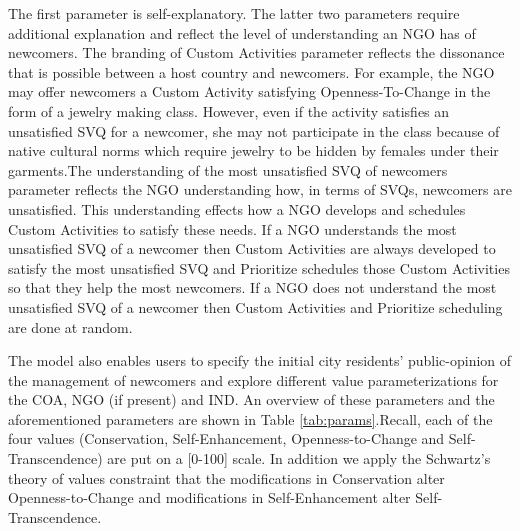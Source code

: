 \documentclass{scspaperproc}
\theoremstyle{scsthe}
\begin{document}
The first parameter is self-explanatory. The latter two parameters require additional explanation and reflect the level of understanding an NGO has of newcomers. The branding of Custom Activities parameter reflects the dissonance that is possible between a host country and newcomers. For example, the NGO may offer newcomers a Custom Activity satisfying Openness-To-Change in the form of a jewelry making class. However, even if the activity satisfies an unsatisfied SVQ for a newcomer, she may not participate in the class because of native cultural norms which require jewelry to be hidden by females under their garments.The understanding of the most unsatisfied SVQ of newcomers parameter reflects the NGO understanding how, in terms of SVQs, newcomers are unsatisfied. This understanding effects how a NGO develops and schedules Custom Activities to satisfy these needs. If a NGO understands the most unsatisfied SVQ of a newcomer then Custom Activities are always developed to satisfy the most unsatisfied SVQ and Prioritize schedules those Custom Activities so that they help the most newcomers. If a NGO does not understand the most unsatisfied SVQ of a newcomer then Custom Activities and Prioritize scheduling are done at random.

The model also enables users to specify the initial city residents' public-opinion of the management of newcomers and explore different value parameterizations for the COA, NGO (if present) and IND. An overview of these parameters and the aforementioned parameters are shown in Table \ref{tab:params}.Recall, each of the four values (Conservation, Self-Enhancement, Openness-to-Change and Self-Transcendence) are put on a [0-100] scale. In addition we apply the Schwartz's theory of values constraint that the modifications in Conservation alter Openness-to-Change and modifications in Self-Enhancement alter Self-Transcendence.
\end{document}
